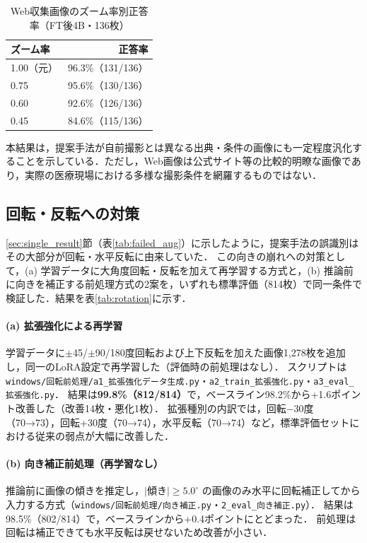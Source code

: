 \documentclass[dvipdfmx]{jsarticle}
\begin{document}
\begin{table}[htbp]
\centering
\caption{Web収集画像のズーム率別正答率（FT後4B・136枚）}
\label{tab:web_zoom}
\begin{tabular}{lr}
\hline
ズーム率 & 正答率 \\
\hline
1.00（元） & 96.3\%（131/136） \\
0.75 & 95.6\%（130/136） \\
0.60 & 92.6\%（126/136） \\
0.45 & 84.6\%（115/136） \\
\hline
\end{tabular}
\end{table}

本結果は，提案手法が自前撮影とは異なる出典・条件の画像にも一定程度汎化することを示している．ただし，Web画像は公式サイト等の比較的明瞭な画像であり，実際の医療現場における多様な撮影条件を網羅するものではない．

\subsection{回転・反転への対策}\label{sec:rotation}

\ref{sec:single_result}節（表\ref{tab:failed_aug}）に示したように，提案手法の誤識別はその大部分が回転・水平反転に由来していた．
この向きの崩れへの対策として，(a) 学習データに大角度回転・反転を加えて再学習する方式と，(b) 推論前に向きを補正する前処理方式の2案を，いずれも標準評価（814枚）で同一条件で検証した．結果を表\ref{tab:rotation}に示す．

\paragraph{(a) 拡張強化による再学習}
学習データに$\pm$45/$\pm$90/180度回転および上下反転を加えた画像1,278枚を追加し，同一のLoRA設定で再学習した（評価時の前処理はなし）．
スクリプトは\texttt{windows/回転前処理/a1\_拡張強化データ生成.py}・\texttt{a2\_train\_拡張強化.py}・\texttt{a3\_eval\_拡張強化.py}．
結果は\textbf{99.8\%（812/814）}で，ベースライン98.2\%から+1.6ポイント改善した（改善14枚・悪化1枚）．
拡張種別の内訳では，回転$-$30度（70→73），回転+30度（70→74），水平反転（70→74）など，標準評価セットにおける従来の弱点が大幅に改善した．

\paragraph{(b) 向き補正前処理（再学習なし）}
推論前に画像の傾きを推定し，$|$傾き$|\geq 5.0^\circ$ の画像のみ水平に回転補正してから入力する方式（\texttt{windows/回転前処理/向き補正.py}・\texttt{2\_eval\_向き補正.py}）．
結果は98.5\%（802/814）で，ベースラインから+0.4ポイントにとどまった．
前処理は回転は補正できても水平反転は戻せないため改善が小さい．
\end{document}
